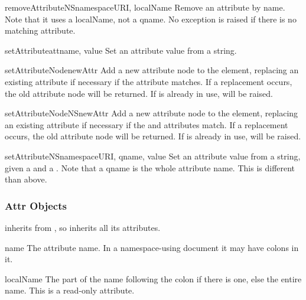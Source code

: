 \begin{methoddesc}[Element]{removeAttributeNS}{namespaceURI, localName}
Remove an attribute by name.  Note that it uses a localName, not a
qname.  No exception is raised if there is no matching attribute.
\end{methoddesc}

\begin{methoddesc}[Element]{setAttribute}{attname, value}
Set an attribute value from a string.
\end{methoddesc}

\begin{methoddesc}[Element]{setAttributeNode}{newAttr}
Add a new attribute node to the element, replacing an existing
attribute if necessary if the  attribute matches.  If a
replacement occurs, the old attribute node will be returned.  If
 is already in use,  will be
raised.
\end{methoddesc}

\begin{methoddesc}[Element]{setAttributeNodeNS}{newAttr}
Add a new attribute node to the element, replacing an existing
attribute if necessary if the  and
 attributes match.  If a replacement occurs, the old
attribute node will be returned.  If  is already in use,
 will be raised.
\end{methoddesc}

\begin{methoddesc}[Element]{setAttributeNS}{namespaceURI, qname, value}
Set an attribute value from a string, given a  and a
.  Note that a qname is the whole attribute name.  This is
different than above.
\end{methoddesc}


\subsubsection{Attr Objects \label{dom-attr-objects}}

 inherits from , so inherits all its
attributes.

\begin{memberdesc}[Attr]{name}
The attribute name.  In a namespace-using document it may have colons
in it.
\end{memberdesc}

\begin{memberdesc}[Attr]{localName}
The part of the name following the colon if there is one, else the
entire name.  This is a read-only attribute.
\end{memberdesc}


